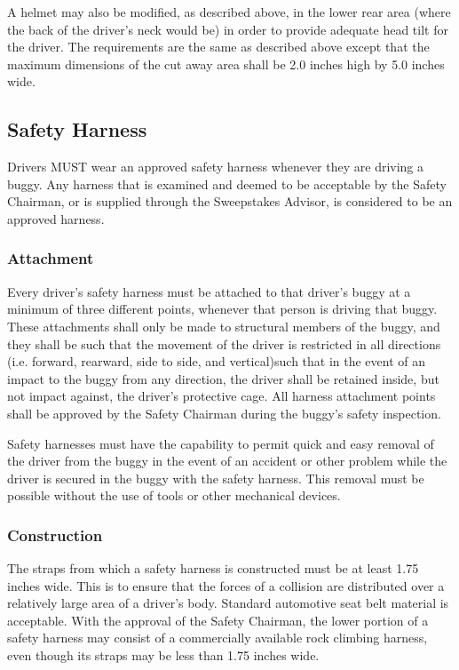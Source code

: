 	A helmet may also be modified, as described above, in the lower rear area
	(where the back of the driver's neck would be) in order to provide adequate
	head tilt for the driver. The requirements are the same as described above
	except that the maximum dimensions of the cut away area shall be 2.0 inches
	high by 5.0 inches wide.

\subsection{Safety Harness}

	Drivers MUST wear an approved safety harness whenever they are driving a buggy.
	Any harness that is examined and deemed to be acceptable by the Safety
	Chairman, or is supplied through the Sweepstakes Advisor, is considered to be
	an approved harness.

\subsubsection{Attachment}

	Every driver's safety harness must be attached to that driver's buggy at a
	minimum of three different points, whenever that person is driving that buggy.
	These attachments shall only be made to structural members of the buggy, and
	they shall be such that the movement of the driver is restricted in all
	directions (i.e. forward, rearward, side to side, and vertical)such that in the
	event of an impact to the buggy from any direction, the driver shall be
	retained inside, but not impact against, the driver's protective cage. All
	harness attachment points shall be approved by the Safety Chairman during the
	buggy's safety inspection.

	Safety harnesses must have the capability to permit quick and easy removal of
	the driver from the buggy in the event of an accident or other problem while
	the driver is secured in the buggy with the safety harness. This removal must
	be possible without the use of tools or other mechanical devices.

\subsubsection{Construction}

	The straps from which a safety harness is constructed must be at least 1.75
	inches wide. This is to ensure that the forces of a collision are distributed
	over a relatively large area of a driver's body. Standard automotive seat belt
	material is acceptable. With the approval of the Safety Chairman, the lower
	portion of a safety harness may consist of a commercially available rock
	climbing harness, even though its straps may be less than 1.75 inches wide.

